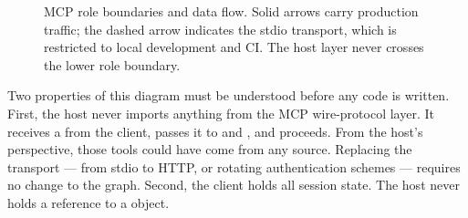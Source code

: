 \begin{figure}[h]
{%
}%
\caption{MCP role boundaries and data flow.
  Solid arrows carry production traffic; the dashed arrow indicates
  the stdio transport, which is restricted to local development and CI\@.
  The host layer never crosses the lower role boundary.}
\label{fig:mcp-boundary}
\end{figure}


Two properties of this diagram must be understood before any code is
written. First, the host never imports anything from the MCP wire-protocol
layer. It receives a  from the client, passes it to
 and , and proceeds. From the
host's perspective, those tools could have come from any source. Replacing
the transport --- from stdio to HTTP, or rotating authentication schemes
--- requires no change to the graph. Second, the client holds all session
state. The host never holds a reference to a  object.

